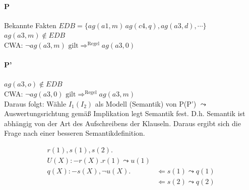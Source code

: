 \documentclass[12pt, a4paper]{article}
\begin{document}
\paragraph{P}
Bekannte Fakten $EDB = \{ ag(a1,m)\, ag(c4,q), ag(a3,d), \cdots \}$ \\
$ag(a3, m) \not \in EDB$ \\
CWA: $\lnot ag(a3, m) \text{ gilt} \Rightarrow^{\text{Regel}} ag(a3,0)$ \\

\paragraph{P'}
$ag(a3, o) \not \in EDB$ \\
CWA: $\lnot ag(a3, 0) \text{ gilt} \Rightarrow^{\text{Regel}} ag(a3,m)$ \\

Daraus folgt: Wähle $I_1(I_2)$ als Modell (Semantik) von P(P') $\leadsto$ Auswertungsrichtung gemäß Implikation legt Semantik fest. D.h. Semantik ist abhängig von der Art des Aufschreibens der Klauseln. Daraus ergibt sich die Frage nach einer besseren Semantikdefinition.


\begin{align*}
r(1), s(1), s(2).& \\
U(X) :- r(X). r(1) \leadsto u(1)& \\
q(X) :- s(X), \lnot u(X).& \Leftarrow s(1) \leadsto q(1)\\
& \Leftarrow s(2) \leadsto q(2)
\end{align*}
\end{document}
